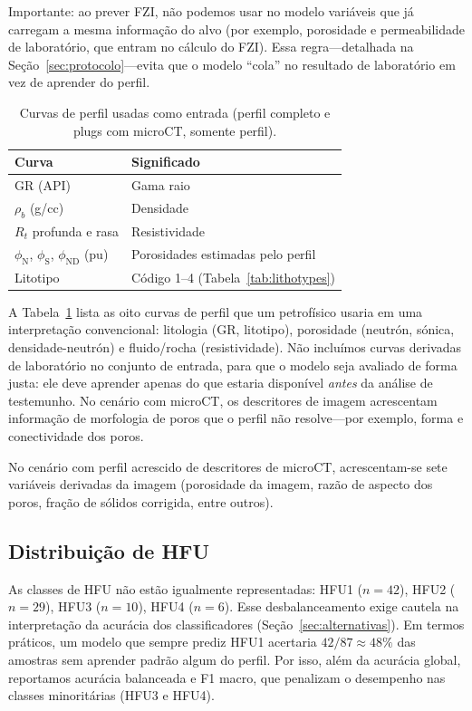\documentclass[11pt,a4paper]{article}
\begin{document}
Importante: ao prever FZI, não podemos usar no modelo variáveis que
já carregam a mesma informação do alvo (por exemplo, porosidade e
permeabilidade de laboratório, que entram no cálculo do FZI).
Essa regra---detalhada na Seção~\ref{sec:protocolo}---evita que o
modelo ``cola'' no resultado de laboratório em vez de aprender do perfil.

\begin{table}[H]
  \centering
  \caption{Curvas de perfil usadas como entrada
           (perfil completo e plugs com microCT, somente perfil).}
  \label{tab:features}
  \begin{tabular}{ll}
    \toprule
    Curva & Significado \\
    \midrule
    GR (API) & Gama raio \\
    $\rho_b$ (g/cc) & Densidade \\
    $R_t$ profunda e rasa & Resistividade \\
    $\phi_{\mathrm{N}}$, $\phi_{\mathrm{S}}$, $\phi_{\mathrm{ND}}$ (pu)
      & Porosidades estimadas pelo perfil \\
    Litotipo & Código 1--4 (Tabela~\ref{tab:lithotypes}) \\
    \bottomrule
  \end{tabular}
\end{table}

A Tabela~\ref{tab:features} lista as oito curvas de perfil que um petrofísico usaria em
uma interpretação convencional: litologia (GR, litotipo), porosidade
(neutrón, sónica, densidade-neutrón) e fluido/rocha (resistividade).
Não incluímos curvas derivadas de laboratório no conjunto de entrada,
para que o modelo seja avaliado de forma justa: ele deve aprender apenas
do que estaria disponível \emph{antes} da análise de testemunho.
No cenário com microCT, os descritores de imagem acrescentam informação
de morfologia de poros que o perfil não resolve---por exemplo, forma e
conectividade dos poros.

No cenário com perfil acrescido de descritores de microCT, acrescentam-se
sete variáveis derivadas da imagem (porosidade da imagem, razão de
aspecto dos poros, fração de sólidos corrigida, entre outros).

\subsection{Distribuição de HFU}

As classes de HFU não estão igualmente representadas:
HFU1 ($n=42$), HFU2 ($n=29$), HFU3 ($n=10$), HFU4 ($n=6$).
Esse desbalanceamento exige cautela na interpretação da acurácia
dos classificadores (Seção~\ref{sec:alternativas}).
Em termos práticos, um modelo que sempre prediz HFU1 acertaria
$42/87 \approx 48\%$ das amostras sem aprender padrão algum do perfil.
Por isso, além da acurácia global, reportamos acurácia balanceada e
F1 macro, que penalizam o desempenho nas classes minoritárias (HFU3 e HFU4).
\end{document}
